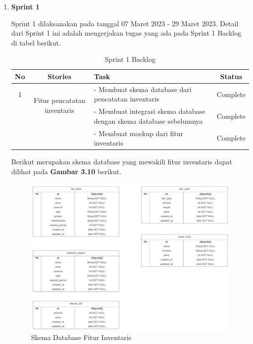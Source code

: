 \begin{enumerate}
	\begin{enumerate}
		\item \textbf{Sprint 1}
		
		Sprint 1 dilaksanakan pada tanggal 07 Maret 2023 - 29 Maret 2023. Detail dari Sprint 1 ini adalah mengerjakan tugas yang ada pada Sprint 1 Backlog di tabel berikut.

		\begin{table}[H]	
			\begin{center}
				\caption{Sprint 1 Backlog}
				\label{tab:table6}
				\begin{tabular}{|c|c|m{13em}|c|}
				\hline
				\textbf{No} & \textbf{Stories} & \textbf{Task} & \textbf{Status} \\
				\hline
				1 & \multirow{2}{10em}{Fitur pencatatan inventaris} & - Membuat skema database dari pencatatan inventaris & Complete \\
				&  & - Membuat integrasi skema database dengan skema database sebelumnya & Complete \\
				&  & - Membuat mockup dari fitur inventaris & Complete \\
				\hline
				\end{tabular}
			\end{center}
		\end{table}

		Berikut merupakan skema database yang mewakili fitur inventaris dapat dilihat pada \textbf{Gambar 3.10} berikut.
		
		\begin{figure}[H]
			\centering
			\includegraphics[width=1\textwidth]{gambar/sprint1/sprint1_inventaris_database.jpeg}
			\caption{Skema Database Fitur Inventaris}
		\end{figure}
	

\end{enumerate}
\end{enumerate}
